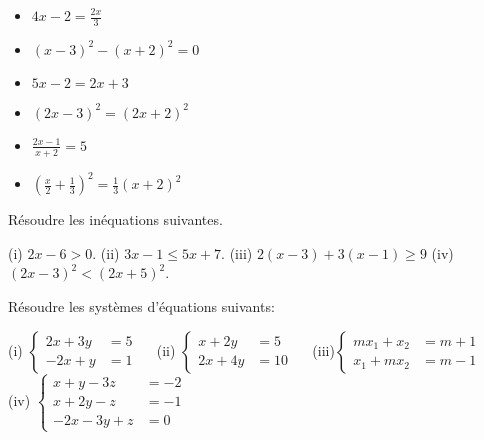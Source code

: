 \documentclass[a4paper, 11pt]{article}
\begin{document}
\begin{minipage}{0.33\textwidth}
 \begin{itemize}
  \item[(i)] $4x-2 = \frac{2x}{3}$\\
  \item[(iv)] $(x-3)^2-(x+2)^2 = 0$\\
 \end{itemize}
\end{minipage}
%
\begin{minipage}{0.3\textwidth}
  \begin{itemize}
  \item[(ii)] $5x-2 = 2x +3$\\
  \item[(v)] $(2x-3)^2 = (2x+2)^2$\\
 \end{itemize}
\end{minipage}
%
\begin{minipage}{0.3\textwidth}
  \begin{itemize}
  \item[(iii)] $\frac{2x-1}{x+2} = 5$\\
  \item[(vi)] $(\frac{x}{2} + \frac{1}{3})^2 = \frac{1}{3} (x+2)^2$ \\
 \end{itemize}
\end{minipage}

\exost R\'esoudre les in\'equations suivantes.

  \begin{center}
    (i) $2x- 6> 0$. \quad (ii) $3x- 1\leq 5x+ 7$. \quad (iii) $2(x- 3)+ 3(x- 1)\geq 9$ \quad (iv) $(2x- 3)^2< (2x+ 5)^2$.
  \end{center}


\exost R\'esoudre les syst\`emes d'\'equations suivants:
  \begin{center}
   (i) $\begin{cases}2x+ 3y &= 5\\
              -2x+ y &= 1 \end{cases}\quad$%
   (ii) $\begin{cases} x+ 2y &= 5 \\
                             2x+ 4y &= 10\end{cases}\quad$%
   (iii)$\begin{cases} mx_1+ x_2 &= m+ 1 \\
                                x_1+ mx_2 &= m- 1\end{cases}$ \\
   (iv) $ \begin{cases}x+ y- 3z&= -2 \\
                            x+ 2y- z&= -1 \\
                            -2x- 3y+ z&= 0\end{cases}$
  \end{center}
\end{document}
